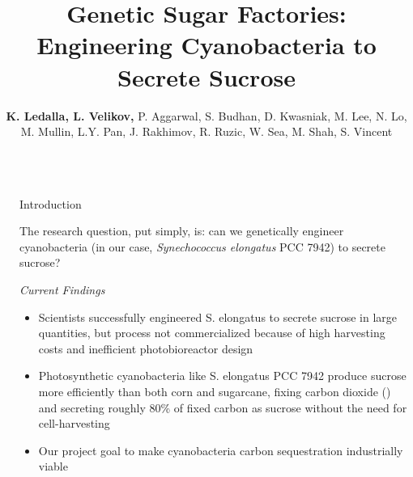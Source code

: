 \documentclass[final]{beamer}
\title{Genetic Sugar Factories: Engineering Cyanobacteria to Secrete Sucrose} %
\author{\textbf{K. Ledalla, L. Velikov,} P. Aggarwal, S. Budhan, D. Kwasniak, M. Lee, N. Lo, M. Mullin, L.Y. Pan, J. Rakhimov, R. Ruzic, W. Sea, M. Shah, S. Vincent} %
\institute{Stony Brook University iGEM Team} %
\newlength{\sepwid}
\newlength{\onecolwid}
\begin{document}

\setlength{\belowcaptionskip}{2ex} %
\setlength\belowdisplayshortskip{2ex} %

\begin{frame}[t] %

\begin{columns}[t] %

\begin{column}{\sepwid}\end{column} %

\begin{column}{\onecolwid} %


\begin{block}{Introduction}

The research question, put simply, is: can we genetically engineer cyanobacteria (in our case, \textit{Synechococcus elongatus} PCC 7942) to secrete sucrose?

\begin{center}
\textit{Current Findings}
\end{center}

\begin{itemize}
\item Scientists successfully engineered S. elongatus to secrete sucrose in large quantities, but process not commercialized because of high harvesting costs and inefficient photobioreactor design \cite{Qiao:2017jd}
\item Photosynthetic cyanobacteria like S. elongatus PCC 7942 produce sucrose more efficiently than both corn and sugarcane, fixing carbon dioxide () and secreting roughly 80\% of fixed carbon as sucrose without the need for cell-harvesting \cite{Ducat:2012jd}
\item Our project goal to make cyanobacteria carbon sequestration industrially viable
\end{itemize}


\end{block}
\end{column}
\end{columns}
\end{frame}
\end{document}
